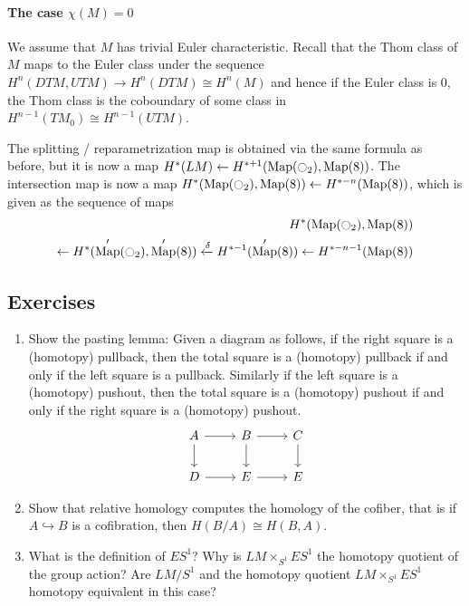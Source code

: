 \documentclass{scrartcl}
\theoremstyle{plain}
\theoremstyle{definition}
\newcommand{\iso}{\cong}
\newcommand{\from}{\leftarrow}
\newcommand{\injto}{\hookrightarrow}
\DeclareMathOperator{\Map}{Map}
\begin{document}
\paragraph{The case $\chi(M) = 0$} We assume that $M$ has trivial Euler characteristic. Recall that the Thom class of $M$ maps to the Euler class under the sequence $H^n(DTM, UTM)\to H^n(DTM)\iso H^n(M)$ and hence if the Euler class is $0$, the Thom class is the coboundary of some class in $H^{n-1}(TM_0)\iso H^{n-1}(UTM)$.

The splitting / reparametrization map is obtained via the same formula as before, but it is now a map $H^*(LM) \from H^{*+1}(\Map(\ocircle_2), \Map(8))$. The intersection map is now a map $H^*(\Map(\ocircle_2), \Map(8)) \from H^{*-n}(\Map(8))$, which is given as the sequence of maps
\begin{align*}
    H^*(\Map(\ocircle_2), \Map(8)) \\ \from H^*(\Map'(\ocircle_2), \Map'(8)) \xleftarrow{\delta} H^{*-1}(\Map'(8)) \from H^{*-n-1}(\Map(8))
\end{align*}


\subsection{Exercises}

\begin{enumerate}
\item Show the pasting lemma: Given a diagram as follows, if the right square is a (homotopy) pullback, then the total square is a (homotopy) pullback if and only if the left square is a pullback. Similarly if the left square is a (homotopy) pushout, then the total square is a (homotopy) pushout if and only if the right square is a (homotopy) pushout.
\begin{equation}
    \begin{tikzcd}
        A \dar\rar & B \dar\rar &\dar C \\
        D \rar & E \rar & E 
    \end{tikzcd}
\end{equation}

\item Show that relative homology computes the homology of the cofiber, that is if $A\injto B$ is a cofibration, then $H(B/A) \iso H(B, A)$.

\item What is the definition of $ES^1$? Why is $LM\times_{S^1} ES^1$ the homotopy quotient of the group action? Are $LM/S^1$ and the homotopy quotient $LM\times_{S^1} ES^1$ homotopy equivalent in this case?


\end{enumerate} %
\end{document}
